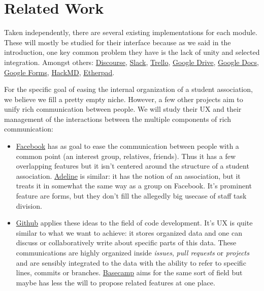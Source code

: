 \documentclass[a4paper, 12pt]{article}
\begin{document}
\section{Related Work}

Taken independently, there are several existing implementations for each module. These will mostly be studied for their interface because as we said in the introduction, one key common problem they have is the lack of unity and selected integration. Amongst others: \href{https://www.discourse.org/}{Discourse}, \href{https://slack.com/}{Slack}, \href{https://trello.com/}{Trello}, \href{https://www.google.com/drive/}{Google Drive}, \href{https://www.google.com/docs/about/}{Google Docs}, \href{https://www.google.com/forms/about/}{Google Forms}, \href{https://hackmd.io/}{HackMD}, \href{http://etherpad.org/}{Etherpad}.

For the specific goal of easing the internal organization of a student association, we believe we fill a pretty empty niche. However, a few other projects aim to unify rich communication between people. We will study their UX and their management of the interactions between the multiple components of rich communication:

\begin{itemize}
  \item \href{https://www.facebook.com/}{Facebook} has as goal to ease the communication between people with a common point (an interest group, relatives, friends). Thus it has a few overlapping features but it isn't centered around the structure of a student association. \href{https://adeline.mobi/}{Adeline} is similar: it has the notion of an association, but it treats it in somewhat the same way as a group on Facebook. It's prominent feature are forms, but they don't fill the allegedly big usecase of staff task division.
  \item \href{https://github.com/}{Github} applies these ideas to the field of code development. It's UX is quite similar to what we want to achieve: it stores organized data and one can discuss or collaboratively write about specific parts of this data. These communications are highly organized inside \textit{issues}, \textit{pull requests} or \textit{projects} and are sensibly integrated to the data with the ability to refer to specific lines, commits or branches. \href{https://basecamp.com}{Basecamp} aims for the same sort of field but maybe has less the will to propose related features at one place.
\end{itemize}
\end{document}
